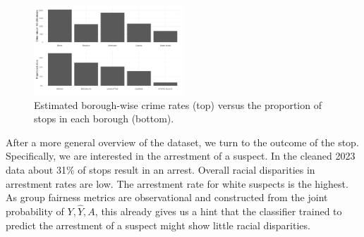 \begin{figure}
    \includegraphics[width=0.5\textwidth]{../figures/sqf_case_study_plot14.png}
    \caption{Estimated borough-wise crime rates (top) versus the proportion of stops in each borough (bottom).}
    \label{fig:nyc_pop_crimerates_stops_comparison}
\end{figure}

After a more general overview of the dataset, we turn to the outcome of the stop. Specifically, we are interested in the arrestment of a suspect. In the cleaned 2023 data about 31\% of stops result in an arrest.
Overall racial disparities in arrestment rates are low. The arrestment rate for white suspects is the highest.
As group fairness metrics are observational and constructed from the joint probability of $Y, \hat{Y}, A$, this already gives us a hint that the classifier trained to predict the arrestment of a suspect might show little racial disparities.

